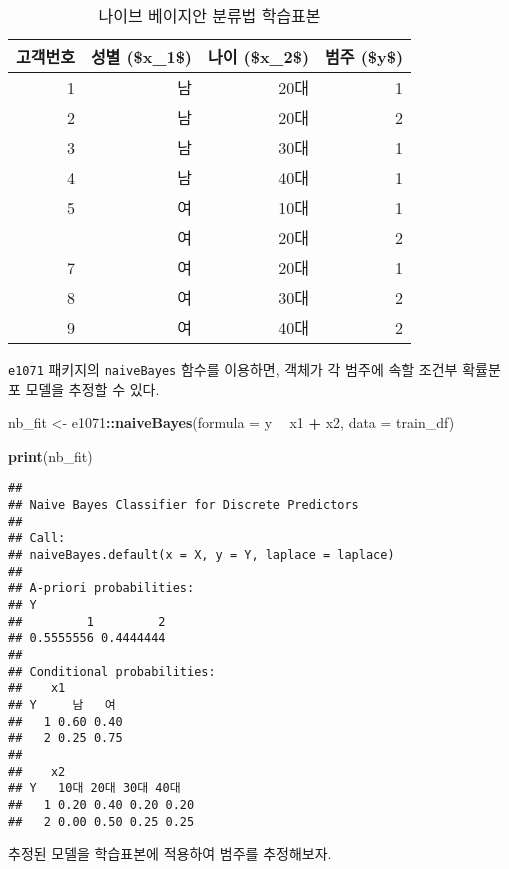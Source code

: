 \documentclass[]{book}
\newenvironment{Shaded}{\begin{snugshade}}{\end{snugshade}}
\newcommand{\DataTypeTok}[1]{\textcolor[rgb]{0.13,0.29,0.53}{#1}}
\newcommand{\KeywordTok}[1]{\textcolor[rgb]{0.13,0.29,0.53}{\textbf{#1}}}
\newcommand{\NormalTok}[1]{#1}
\newcommand{\OperatorTok}[1]{\textcolor[rgb]{0.81,0.36,0.00}{\textbf{#1}}}
\newcommand{\StringTok}[1]{\textcolor[rgb]{0.31,0.60,0.02}{#1}}
\begin{document}
\begin{table}[t]

\caption{\label{tab:naive-bayes-data}나이브 베이지안 분류법 학습표본}
\centering
\begin{tabular}{rrrr}
\toprule
고객번호 & 성별 (\$x\_1\$) & 나이 (\$x\_2\$) & 범주 (\$y\$)\\
\midrule
1 & 남 & 20대 & 1\\
2 & 남 & 20대 & 2\\
3 & 남 & 30대 & 1\\
4 & 남 & 40대 & 1\\
5 & 여 & 10대 & 1\\
\addlinespace
6 & 여 & 20대 & 2\\
7 & 여 & 20대 & 1\\
8 & 여 & 30대 & 2\\
9 & 여 & 40대 & 2\\
\bottomrule
\end{tabular}
\end{table}

\texttt{e1071} 패키지의 \texttt{naiveBayes} 함수를 이용하면, 객체가 각 범주에 속할 조건부 확률분포 모델을 추정할 수 있다.

\begin{Shaded}
\begin{Highlighting}[]
\NormalTok{nb_fit <-}\StringTok{ }\NormalTok{e1071}\OperatorTok{::}\KeywordTok{naiveBayes}\NormalTok{(}\DataTypeTok{formula =}\NormalTok{ y }\OperatorTok{~}\StringTok{ }\NormalTok{x1 }\OperatorTok{+}\StringTok{ }\NormalTok{x2, }\DataTypeTok{data =}\NormalTok{ train_df)}

\KeywordTok{print}\NormalTok{(nb_fit)}
\end{Highlighting}
\end{Shaded}

\begin{verbatim}
## 
## Naive Bayes Classifier for Discrete Predictors
## 
## Call:
## naiveBayes.default(x = X, y = Y, laplace = laplace)
## 
## A-priori probabilities:
## Y
##         1         2 
## 0.5555556 0.4444444 
## 
## Conditional probabilities:
##    x1
## Y     남   여
##   1 0.60 0.40
##   2 0.25 0.75
## 
##    x2
## Y   10대 20대 30대 40대
##   1 0.20 0.40 0.20 0.20
##   2 0.00 0.50 0.25 0.25
\end{verbatim}

추정된 모델을 학습표본에 적용하여 범주를 추정해보자.
\end{document}
